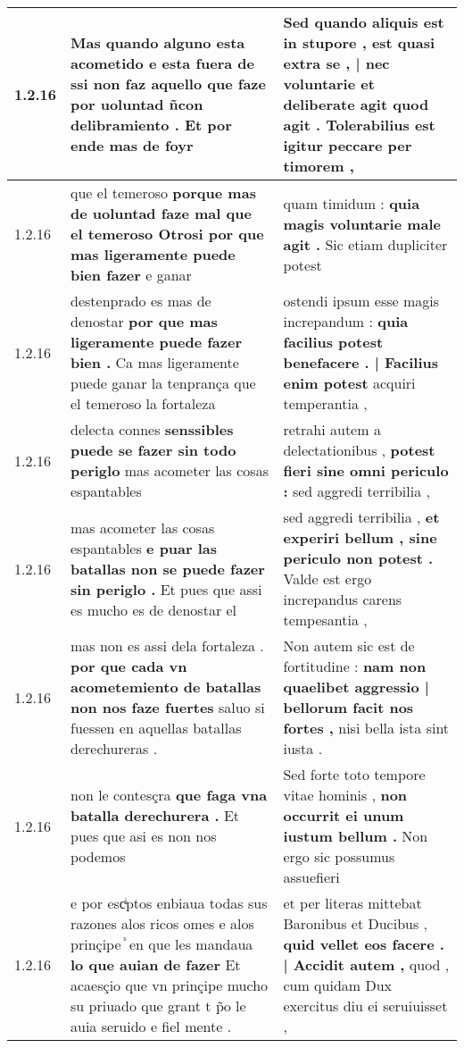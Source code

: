 \begin{tabular}{|p{1cm}|p{6.5cm}|p{6.5cm}|}
1.2.16 & Mas quando alguno esta acometido \textbf{ e esta fuera de ssi non faz aquello que faze por uoluntad ñcon delibramiento . } Et por ende mas de foyr & Sed quando aliquis est in stupore , \textbf{ est quasi extra se , | nec voluntarie et deliberate agit quod agit . } Tolerabilius est igitur peccare per timorem , \\\hline
1.2.16 & que el temeroso \textbf{ porque mas de uoluntad faze mal que el temeroso Otrosi por que mas ligeramente puede bien fazer } e ganar & quam timidum : \textbf{ quia magis voluntarie male agit . } Sic etiam dupliciter potest \\\hline
1.2.16 & destenprado es mas de denostar \textbf{ por que mas ligeramente puede fazer bien . } Ca mas ligeramente puede ganar la tenprança que el temeroso la fortaleza & ostendi ipsum esse magis increpandum : \textbf{ quia facilius potest benefacere . | Facilius enim potest } acquiri temperantia , \\\hline
1.2.16 & delecta connes \textbf{ senssibles puede se fazer sin todo periglo } mas acometer las cosas espantables & retrahi autem a delectationibus , \textbf{ potest fieri sine omni periculo : } sed aggredi terribilia , \\\hline
1.2.16 & mas acometer las cosas espantables \textbf{ e puar las batallas non se puede fazer sin periglo . } Et pues que assi es mucho es de denostar el & sed aggredi terribilia , \textbf{ et experiri bellum , sine periculo non potest . } Valde est ergo increpandus carens tempesantia , \\\hline
1.2.16 & mas non es assi dela fortaleza . \textbf{ por que cada vn acometemiento de batallas non nos faze fuertes } saluo si fuessen en aquellas batallas derechureras . & Non autem sic est de fortitudine : \textbf{ nam non quaelibet aggressio | bellorum facit nos fortes , } nisi bella ista sint iusta . \\\hline
1.2.16 & non le contesçra \textbf{ que faga vna batalla derechurera . } Et pues que asi es non nos podemos & Sed forte toto tempore vitae hominis , \textbf{ non occurrit ei unum iustum bellum . } Non ergo sic possumus assuefieri \\\hline
1.2.16 & e por escͥptos enbiaua todas sus razones alos ricos omes e alos prinçipe ᷤ en que les mandaua \textbf{ lo que auian de fazer } Et acaesçio que vn prinçipe mucho su priuado que grant t p̃o le auia seruido e fiel mente . & et per literas mittebat Baronibus et Ducibus , \textbf{ quid vellet eos facere . | Accidit autem , } quod , cum quidam Dux exercitus diu ei seruiuisset , \\\hline

\end{tabular}
